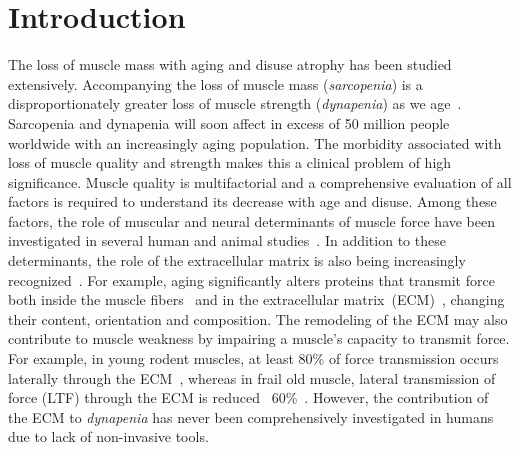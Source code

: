 \chapter{Introduction}
The loss of muscle mass with aging and disuse atrophy has been studied extensively. 
Accompanying the loss of muscle mass (\textit{sarcopenia}) is a disproportionately greater loss of muscle strength (\textit{dynapenia}) as we age~\cite{RNIGoodpaster}. 
Sarcopenia and dynapenia will soon affect in excess of 50 million people worldwide with an increasingly aging population. 
The morbidity associated with loss of muscle quality and strength makes this a clinical problem of high significance. 
Muscle quality is multifactorial and a comprehensive evaluation of all factors is required to understand its decrease with age and disuse. Among these factors, the role of muscular and neural determinants of muscle force have been investigated in several human and animal studies~\cite{RNIBallak}.
In addition to these determinants, the role of the extracellular matrix is also being increasingly recognized~\cite{RNIRamaswamy, RNIZhang}. 
For example, aging significantly alters proteins that transmit force both inside the muscle fibers~\cite{RNIHughes} and in the extracellular matrix~(ECM)~\cite{RNIKragstrup}, changing their content, orientation and composition. 
The remodeling of the ECM may also contribute to muscle weakness by impairing a muscle's capacity to transmit force. 
For example, in young rodent muscles, at least 80\% of force transmission occurs laterally through the ECM~\cite{RNIHuijing}, whereas in frail old muscle, lateral transmission of force (LTF) through the ECM is reduced ~60\%~\cite{RNIRamaswamy, RNIZhang}. 
However, the contribution of the ECM to \textit{dynapenia} has never been comprehensively investigated in humans due to lack of non-invasive tools.

